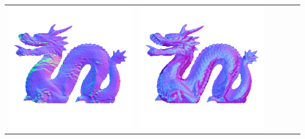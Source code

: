 \begin{center}
\begin{tabularx}{\linewidth}{@{}Y@{}Y@{}Y@{}Y@{}Y@{}Y@{}}
\includegraphics[width=\linewidth]{semisynthetic/20150514_21_yu_out.png} &
\includegraphics[width=\linewidth]{semisynthetic/20150514_21_dpsn_out.png} &

\end{tabularx}
\end{center}

